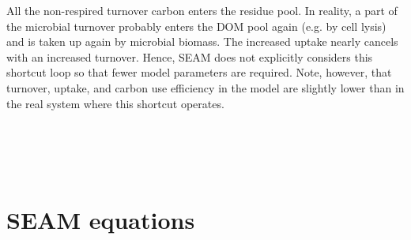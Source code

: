 All the non-respired turnover carbon enters the residue pool. In reality, a part
of the microbial turnover probably enters the DOM pool again (e.g. by cell
lysis) and is taken up again by microbial biomass. The increased uptake nearly
cancels with an increased turnover. Hence, SEAM does not explicitly considers this
shortcut loop so that fewer model parameters are required.
Note, however, that turnover, uptake, and carbon use efficiency in the model are
slightly lower than in the real system where this shortcut operates.


\section{\\ \\ \hspace*{-7mm}  SEAM equations \label{app:fAlphaFix}}    %


